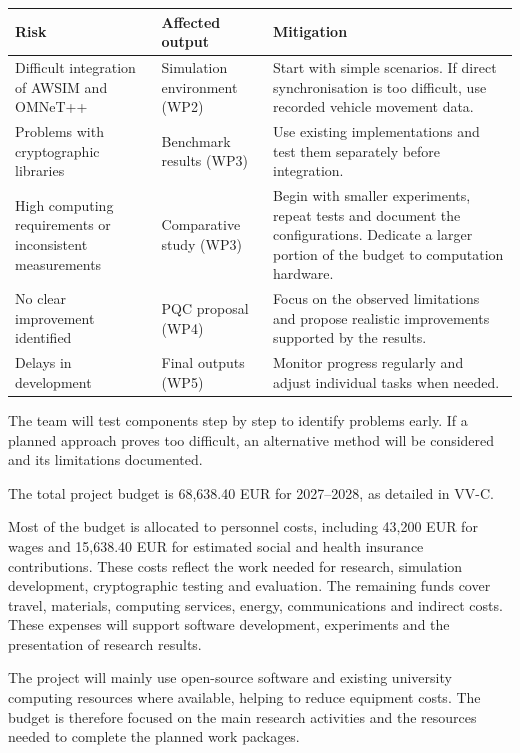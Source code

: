 \documentclass[10pt,a4paper]{article}
\newcommand{\medsec}[1]{\par\needspace{3\baselineskip}\vspace{6pt}\noindent{\large\sffamily\bfseries\color{navy}#1}\par\vspace{3pt}}
\begin{document}
\par\medskip\noindent\small\begin{tabular}{@{}L{49.40mm}L{41.16mm}L{74.10mm}@{}}
\toprule
\textbf{Risk} & \textbf{Affected output} & \textbf{Mitigation} \\
\midrule
Difficult integration of AWSIM and OMNeT++ & Simulation environment (WP2) & Start with simple scenarios. If direct synchronisation is too difficult, use recorded vehicle movement data. \\
Problems with cryptographic libraries & Benchmark results (WP3) & Use existing implementations and test them separately before integration. \\
High computing requirements or inconsistent measurements & Comparative study (WP3) & Begin with smaller experiments, repeat tests and document the configurations. Dedicate a larger portion of the budget to computation hardware. \\
No clear improvement identified & PQC proposal (WP4) & Focus on the observed limitations and propose realistic improvements supported by the results. \\
Delays in development & Final outputs (WP5) & Monitor progress regularly and adjust individual tasks when needed. \\
\bottomrule\end{tabular}\normalsize\par\medskip
The team will test components step by step to identify problems early. If a planned approach proves too difficult, an alternative method will be considered and its limitations documented.\par

\medsec{3.4 Budget Justification}
The total project budget is 68,638.40 EUR for 2027--2028, as detailed in VV-C.\par

Most of the budget is allocated to personnel costs, including 43,200 EUR for wages and 15,638.40 EUR for estimated social and health insurance contributions. These costs reflect the work needed for research, simulation development, cryptographic testing and evaluation. The remaining funds cover travel, materials, computing services, energy, communications and indirect costs. These expenses will support software development, experiments and the presentation of research results.\par

The project will mainly use open-source software and existing university computing resources where available, helping to reduce equipment costs. The budget is therefore focused on the main research activities and the resources needed to complete the planned work packages.\par
\end{document}
